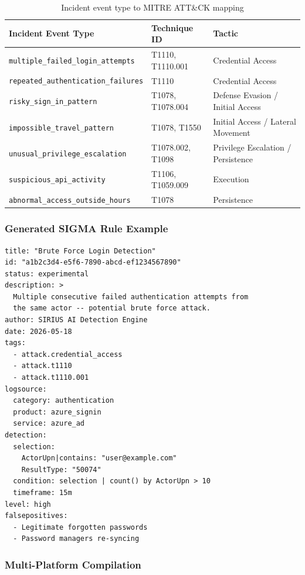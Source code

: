 \documentclass[12pt,a4paper]{article}
\begin{document}
\begin{table}[H]
\centering
\caption{Incident event type to MITRE ATT\&CK mapping}
\begin{tabular}{lll}
\toprule
\textbf{Incident Event Type} & \textbf{Technique ID} & \textbf{Tactic} \\
\midrule
\texttt{multiple\_failed\_login\_attempts}  & T1110, T1110.001 & Credential Access \\
\texttt{repeated\_authentication\_failures} & T1110             & Credential Access \\
\texttt{risky\_sign\_in\_pattern}           & T1078, T1078.004 & Defense Evasion / Initial Access \\
\texttt{impossible\_travel\_pattern}        & T1078, T1550      & Initial Access / Lateral Movement \\
\texttt{unusual\_privilege\_escalation}     & T1078.002, T1098 & Privilege Escalation / Persistence \\
\texttt{suspicious\_api\_activity}          & T1106, T1059.009 & Execution \\
\texttt{abnormal\_access\_outside\_hours}   & T1078             & Persistence \\
\bottomrule
\end{tabular}
\end{table}

\subsubsection{Generated SIGMA Rule Example}

\begin{lstlisting}[style=yamlstyle, caption=Sample SIGMA rule --- brute-force detection]
title: "Brute Force Login Detection"
id: "a1b2c3d4-e5f6-7890-abcd-ef1234567890"
status: experimental
description: >
  Multiple consecutive failed authentication attempts from
  the same actor -- potential brute force attack.
author: SIRIUS AI Detection Engine
date: 2026-05-18
tags:
  - attack.credential_access
  - attack.t1110
  - attack.t1110.001
logsource:
  category: authentication
  product: azure_signin
  service: azure_ad
detection:
  selection:
    ActorUpn|contains: "user@example.com"
    ResultType: "50074"
  condition: selection | count() by ActorUpn > 10
  timeframe: 15m
level: high
falsepositives:
  - Legitimate forgotten passwords
  - Password managers re-syncing
\end{lstlisting}

\subsubsection{Multi-Platform Compilation}
\end{document}
